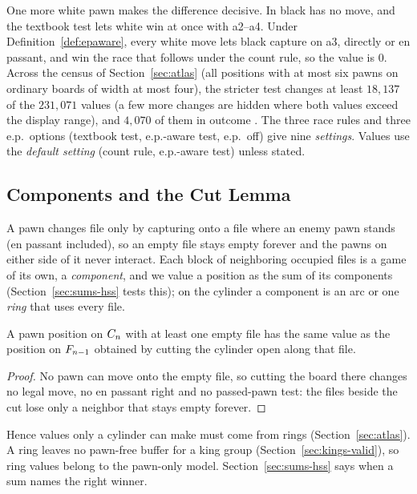 One more white pawn makes the difference decisive. In  black has no move, and the textbook
test lets white win at once with a2--a4. Under Definition~\ref{def:epaware}, every white move lets black capture
on a3, directly or en passant, and win the race that follows under the count rule, so the value is $0$. Across
the census of Section~\ref{sec:atlas} (all positions with at most six pawns on ordinary boards of width at
most four), the stricter test changes at least $18{,}137$ of the $231{,}071$ values (a few more changes are hidden
where both values exceed the display range), and $4{,}070$ of them in outcome . The three race rules and three e.p.\ options (textbook test, e.p.-aware test, e.p.\ off) give nine
\emph{settings}. Values use the \emph{default setting} (count rule, e.p.-aware test) unless
stated.

\subsection{Components and the Cut Lemma}
A pawn changes file only by capturing onto a file where an enemy pawn stands (en passant included), so an empty
file stays empty forever and the pawns on either side of it never interact. Each block of neighboring occupied
files is a game of its own, a \emph{component}, and we value a position as the sum of its components (Section~\ref{sec:sums-hss} tests this); on the cylinder a
component is an arc or one \emph{ring} that uses every file.

\begin{theorem}\label{thm:cut}
A pawn position on $C_{n}$ with at least one empty file has the same value as the position on
$F_{n-1}$ obtained by cutting the cylinder open along that file.
\end{theorem}

\begin{proof}
No pawn can move onto the empty file, so cutting the board there changes no legal move, no en passant right and
no passed-pawn test: the files beside the cut lose only a neighbor that stays empty forever.
\end{proof}

Hence values only a cylinder can make must come from rings (Section~\ref{sec:atlas}). A ring leaves no
pawn-free buffer for a king group (Section~\ref{sec:kings-valid}), so ring values belong to the pawn-only model.
Section~\ref{sec:sums-hss} says when a sum names the right winner.
